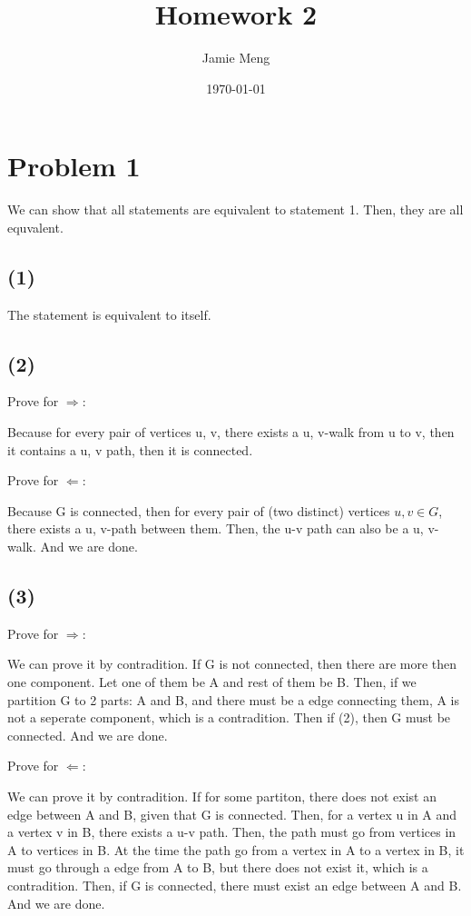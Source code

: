 \documentclass[11pt]{article}
\begin{document}
\title{Homework 2}
\author{Jamie Meng}
\date{\today}

\maketitle
\section{Problem 1}
We can show that all statements are equivalent to statement 1. Then, they are all equvalent. 
\subsection*{(1)}
The statement is equivalent to itself.
\subsection*{(2)}

Prove for $\Rightarrow $:

Because for every pair of vertices u, v, there exists a u, v-walk from u to v, then it contains a u, v path, then it is connected. 

Prove for $\Leftarrow  $:

Because G is connected, then for every pair of (two distinct) vertices \(u ,v \in G\), there exists a u, v-path between them. Then, the u-v path can also be a u, v-walk. And we are done.
\subsection*{(3)}
Prove for $\Rightarrow $:

We can prove it by contradition. If G is not connected, then there are more then one component. Let one of them be A and rest of them be B. Then, if we partition G to 2 parts: A and B, and there must be a edge connecting them, A is not a seperate component, which is a contradition. Then if (2), then G must be connected. And we are done.

Prove for $\Leftarrow  $:

We can prove it by contradition. If for some partiton, there does not exist an edge between A and B, given that G is connected. Then, for a vertex u in A and a vertex v in B, there exists a u-v path. Then, the path must go from vertices in A to vertices in B. At the time the path go from a vertex in A to a vertex in B, it must go through a edge from A to B, but there does not exist it, which is a contradition. Then, if G is connected, there must exist an edge between A and B. And we are done.
\end{document}
